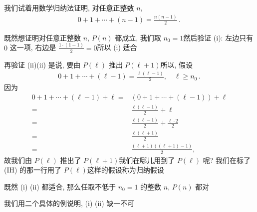\begin{example}
    我们试着用数学归纳法证明, 对任意正整数 $n$,
    \begin{align*}
        0 + 1 + \cdots + (n - 1) = \frac{n(n-1)}{2} \period \tag*{$P(n) \colon$}
    \end{align*}

    既然想证明对任意正整数 $n$, $P(n)$ 都成立, 我们取 $n_0 = 1$\period 然后验证 (i): 左边只有 $0$ 这一项, 右边是 $\frac{1 \cdot (1-1)}{2} = 0$\period 所以 (i) 适合\period

    再验证 (ii)\period (ii) 是说, 要由 $P(\ell)$ 推出 $P(\ell + 1)$\period 所以, 假设
    \begin{align*}
        0 + 1 + \cdots + (\ell - 1) = \frac{\ell(\ell-1)}{2}, \quad \ell \geq n_0 \period
    \end{align*}
    因为
    \begin{align*}
        0 + 1 + \cdots + (\ell - 1) + \ell
        = {} & (0 + 1 + \cdots + (\ell - 1)) + \ell            \\
        = {} & \frac{\ell(\ell-1)}{2} + \ell \tag*{(IH)}       \\
        = {} & \frac{\ell(\ell-1)}{2} + \frac{\ell \cdot 2}{2} \\
        = {} & \frac{\ell(\ell+1)}{2}                          \\
        = {} & \frac{(\ell+1)((\ell+1) - 1)}{2},
    \end{align*}
    故我们由 $P(\ell)$ 推出了 $P(\ell + 1)$\period 我们在哪儿用到了 $P(\ell)$ 呢? 我们在标了 (IH) 的那一行用了 $P(\ell)$\period 这样的假设称为归纳假设 \period

    既然 (i) (ii) 都适合, 那么任取不低于 $n_0=1$ 的整数 $n$, $P(n)$ 都对\period
\end{example}

我们用二个具体的例说明, (i) (ii) 缺一不可\period

